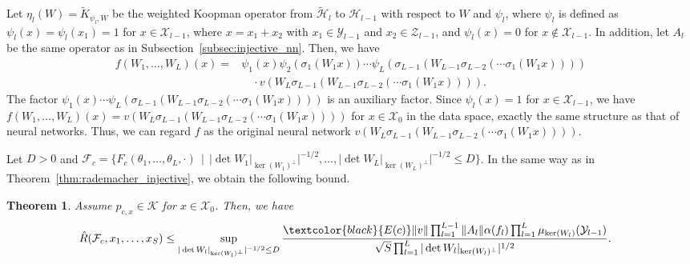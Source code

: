 \documentclass[twoside]{article}
\newtheorem{theorem}[proposition]{Theorem}
\def\mcl#1{\mathcal{#1}}
\def\hil{\mcl{H}}
\def\opn{\operatorname}
\def\red#1{\textcolor{black}{#1}}
\begin{document}
Let $\eta_l(W)=\tilde{K}_{\psi_l,W}$ be the weighted Koopman operator from $\tilde{\hil}_l$ to $\hil_{l-1}$ with respect to $W$ and $\psi_l$, where $\psi_l$ is defined as $\psi_l(x)=\psi_l(x_1)=1$ for $x\in\mcl{X}_{l-1}$, where $x=x_1+x_2$ with $x_1\in \mcl{Y}_{l-1}$ and $x_2\in \mcl{Z}_{l-1}$, and $\psi_l(x)=0$ for $x\notin \mcl{X}_{l-1}$. 
In addition, let $A_l$ be the same operator as in Subsection~\ref{subsec:injective_nn}.
Then, we have
\begin{align*}
f(W_1,\ldots,W_L)(x)=&\psi_1(x)\psi_2(\sigma_1(W_1x))\cdots\psi_L(\sigma_{L-1}(W_{L-1}\sigma_{L-2}(\cdots \sigma_1(W_1x))))\\
&\quad \cdot v(W_L\sigma_{L-1}(W_{L-1}\sigma_{L-2}(\cdots \sigma_1(W_1x)))). 
\end{align*}
The factor $\psi_1(x)\cdots \psi_L(\sigma_{L-1}(W_{L-1}\sigma_{L-2}(\cdots \sigma_1(W_1x))))$ is an auxiliary factor.
Since $\psi_l(x)=1$ for $x\in\mcl{X}_{l-1}$, we have $f(W_1,\ldots,W_L)(x)=v(W_L\sigma_{L-1}(W_{L-1}\sigma_{L-2}(\cdots \sigma_1(W_1x))))$ for $x\in\mcl{X}_0$ in the data space, exactly the same structure as that of neural networks.
Thus, we can regard $f$ as the original neural network $v(W_L\sigma_{L-1}(W_{L-1}\sigma_{L-2}(\cdots \sigma_1(W_1x))))$.

Let $D>0$ and $\mcl{F}_c=\{F_c(\theta_1,\ldots,\theta_L,\cdot)\,\mid\,\vert\det{W_1\vert_{\opn{ker}(W_1)^{\perp}}}\vert^{-1/2},\ldots,\vert\det{W_L\vert_{\opn{ker}(W_L)^{\perp}}}\vert^{-1/2}\le D\}$.
In the same way as in Theorem~\ref{thm:rademacher_injective}, we obtain the following bound.
\begin{theorem}\label{thm:bound_general}
Assume $p_{c,x}\in\mcl{K}$ for $x\in \mcl{X}_0$.
Then, we have
\begin{align*}
 \hat{R}(\mcl{F}_c,x_1,\ldots,x_S)&\le \sup_{\vert\det{W_l}\vert_{\opn{ker}(W_l)^{\perp}}\vert^{-1/2}\le D}\frac{\red{E(c)}\Vert v\Vert\prod_{l=1}^{L-1}\Vert A_l\Vert  \alpha(f_l)\prod_{l=1}^L\mu_{\opn{ker}(W_l)}(\mcl{Y}_{l-1})}{\sqrt{S}\prod_{l=1}^L\vert\det W_l\vert_{\opn{ker}(W_l)^{\perp}}\vert^{1/2}}.
\end{align*}
\end{theorem}
\end{document}
